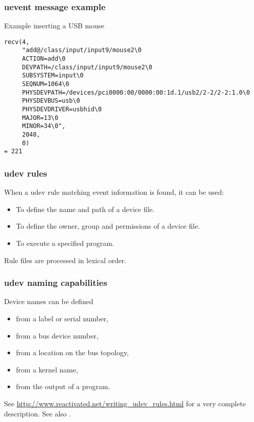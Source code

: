 \begin{frame}[fragile]
  \frametitle{uevent message example}
  Example inserting a USB mouse
  \begin{block}{}
\tiny
\begin{verbatim}
recv(4,
     "add@/class/input/input9/mouse2\0
     ACTION=add\0
     DEVPATH=/class/input/input9/mouse2\0
     SUBSYSTEM=input\0
     SEQNUM=1064\0
     PHYSDEVPATH=/devices/pci0000:00/0000:00:1d.1/usb2/2-2/2-2:1.0\0
     PHYSDEVBUS=usb\0
     PHYSDEVDRIVER=usbhid\0
     MAJOR=13\0
     MINOR=34\0",
     2048,
     0)
= 221
\end{verbatim}
  \end{block}
\end{frame}

\begin{frame}
  \frametitle{udev rules}
  When a udev rule matching event information is found, it can be
  used:
  \begin{itemize}
  \item To define the name and path of a device file.
  \item To define the owner, group and permissions of a device file.
  \item To execute a specified program.
  \end{itemize}
  Rule files are processed in lexical order.
\end{frame}

\begin{frame}
  \frametitle{udev naming capabilities}
  Device names can be defined
  \begin{itemize}
  \item from a label or serial number,
  \item from a bus device number,
  \item from a location on the bus topology,
  \item from a kernel name,
  \item from the output of a program.
  \end{itemize}
See \url{http://www.reactivated.net/writing_udev_rules.html}
for a very complete description. See also .
\end{frame}

